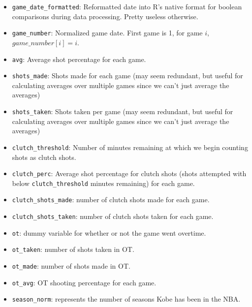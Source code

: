 \documentclass[paper=a4, fontsize=11pt]{scrartcl} %
\numberwithin{equation}{section} %
\numberwithin{figure}{section} %
\numberwithin{table}{section} %
\begin{document}
\begin{itemize}
\item \texttt{game\_date\_formatted}: Reformatted date into R's native format for boolean comparisons during data processing. Pretty useless otherwise.
\item \texttt{game\_number}: Normalized game date. First game is 1, for game $i$, $game\_number[i] = i$.
\item \texttt{avg}: Average shot percentage for each game.
\item \texttt{shots\_made}: Shots made for each game (may seem redundant, but useful for calculating averages over multiple games since we can't just average the averages)
\item \texttt{shots\_taken}: Shots taken per game (may seem redundant, but useful for calculating averages over multiple games since we can't just average the averages)
\item \texttt{clutch\_threshold}: Number of minutes remaining at which we begin counting shots as clutch shots.
\item \texttt{clutch\_perc}: Average shot percentage for clutch shots (shots attempted with below \texttt{clutch\_threshold} minutes remaining) for each game.
\item \texttt{clutch\_shots\_made}: number of clutch shots made for each game.
\item \texttt{clutch\_shots\_taken}: number of clutch shots taken for each game. 
\item \texttt{ot}: dummy variable for whether or not the game went overtime.
\item \texttt{ot\_taken}: number of shots taken in OT.
\item \texttt{ot\_made}: number of shots made in OT.
\item \texttt{ot\_avg}: OT shooting percentage for each game.
\item \texttt{season\_norm}: represents the number of seasons Kobe has been in the NBA.
\end{itemize}
\end{document}
